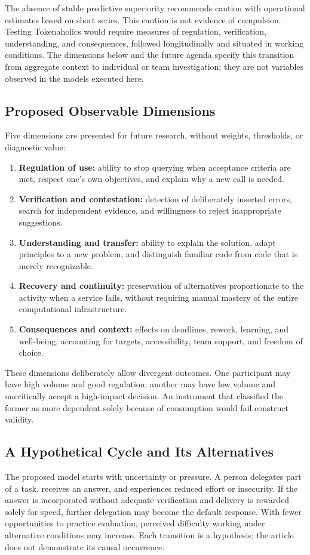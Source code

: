 \documentclass[11pt,a4paper]{article}
\begin{document}
The absence of stable predictive superiority recommends caution with operational estimates based on short series. This caution is not evidence of compulsion. Testing Tokenaholics would require measures of regulation, verification, understanding, and consequences, followed longitudinally and situated in working conditions. The dimensions below and the future agenda specify this transition from aggregate context to individual or team investigation; they are not variables observed in the models executed here.

\subsection{Proposed Observable Dimensions}
Five dimensions are presented for future research, without weights, thresholds, or diagnostic value:
\begin{enumerate}
\item \textbf{Regulation of use:} ability to stop querying when acceptance criteria are met, respect one's own objectives, and explain why a new call is needed.
\item \textbf{Verification and contestation:} detection of deliberately inserted errors, search for independent evidence, and willingness to reject inappropriate suggestions.
\item \textbf{Understanding and transfer:} ability to explain the solution, adapt principles to a new problem, and distinguish familiar code from code that is merely recognizable.
\item \textbf{Recovery and continuity:} preservation of alternatives proportionate to the activity when a service fails, without requiring manual mastery of the entire computational infrastructure.
\item \textbf{Consequences and context:} effects on deadlines, rework, learning, and well-being, accounting for targets, accessibility, team support, and freedom of choice.
\end{enumerate}
These dimensions deliberately allow divergent outcomes. One participant may have high volume and good regulation; another may have low volume and uncritically accept a high-impact decision. An instrument that classified the former as more dependent solely because of consumption would fail construct validity.

\subsection{A Hypothetical Cycle and Its Alternatives}
The proposed model starts with uncertainty or pressure. A person delegates part of a task, receives an answer, and experiences reduced effort or insecurity. If the answer is incorporated without adequate verification and delivery is rewarded solely for speed, further delegation may become the default response. With fewer opportunities to practice evaluation, perceived difficulty working under alternative conditions may increase. Each transition is a hypothesis; the article does not demonstrate its causal occurrence.
\end{document}
